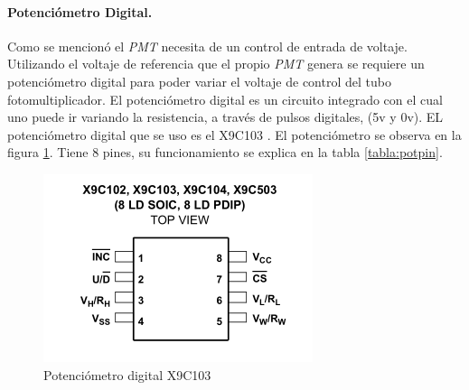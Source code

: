 \paragraph{Potenciómetro Digital.}
Como se mencionó el \textit{PMT} necesita de un control de entrada de voltaje. Utilizando el voltaje de referencia que el propio \textit{PMT} genera se requiere un potenciómetro digital para poder variar el voltaje de control del tubo fotomultiplicador. 
El potenciómetro digital es un circuito integrado con el cual uno puede ir variando la resistencia, a través de pulsos digitales, (5v y 0v). EL potenciómetro digital que se uso es el X9C103 \cite{X9C102}. El potenciómetro se observa en la figura \ref{fig:potdig}. Tiene 8 pines, su funcionamiento se explica en la tabla \ref{tabla:potpin}. %
\begin{figure}[h]
	\centering
	\includegraphics[width=0.5\linewidth]{Imagenes/2/potDig}
	\caption{Potenciómetro digital X9C103 \cite{X9C102}}
	\label{fig:potdig}
\end{figure}

